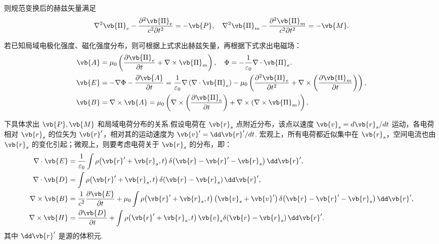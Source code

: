 则规范变换后的赫兹矢量满足
\begin{align*}
	\nabla^2 \vb{\Pi}_e - \frac{\partial^2 \vb{\Pi}_e}{c^2 \partial t^2} = -\vb{P}, \quad \nabla^2 \vb{\Pi}_m - \frac{\partial^2 \vb{\Pi}_m}{c^2 \partial t^2} = -\vb{M}.
\end{align*}

若已知局域电极化强度、磁化强度分布，则可根据上式求出赫兹矢量，再根据下式求出电磁场：
\begin{align*}
	\vb{A} &= \mu_0 \left( \frac{\partial \vb{\Pi}_e}{\partial t} + \nabla \times \vb{\Pi}_m \right), \quad \Phi = -\frac{1}{\varepsilon_0} \nabla \cdot \vb{\Pi}_e. \\
	\vb{E} &= -\nabla \Phi - \frac{\partial \vb{A}}{\partial t} = \frac{1}{\varepsilon_0} \nabla \left( \nabla \cdot \vb{\Pi}_e \right) - \mu_0 \left( \frac{\partial^2 \vb{\Pi}_e}{\partial t^2} + \nabla \times \left( \frac{\partial \vb{\Pi}_m}{\partial t} \right) \right), \\
	\vb{B} &= \nabla \times \vb{A} = \mu_0 \left( \nabla \times \left( \frac{\partial \vb{\Pi}_e}{\partial t} \right) + \nabla \times \left( \nabla \times \vb{\Pi}_m \right) \right).
\end{align*}

下具体求出 \(\vb{P}, \vb{M}\) 和局域电荷分布的关系.假设电荷在 \(\vb{r}_s\) 点附近分布，该点以速度 \(\vb{v}_s = d\vb{r}_s/dt\) 运动，各电荷相对 \(\vb{r}_s\) 的位矢为 \(\vb{r}'\)，相对其的运动速度为 \(\vb{v}' = \dd \vb{r}'/dt\).
宏观上，所有电荷都近似集中在 \(\vb{r}_s\)，空间电流也由 \(\vb{r}_s\) 的变化引起；微观上，则要考虑电荷关于 \(\vb{r}_s\) 的分布，即：
\begin{align*}
	\nabla \cdot \vb{E} &= \frac{1}{\varepsilon_0} \int \rho\!\left( \vb{r}' + \vb{r}_s, t \right) \delta\!\left( \vb{r} - \vb{r}' - \vb{r}_s \right) \dd \vb{r}', \\
	\nabla \cdot \vb{D} &= \int \rho\!\left( \vb{r}' + \vb{r}_s, t \right) \delta\!\left( \vb{r} - \vb{r}_s \right) \dd \vb{r}', \\
	\nabla \times \vb{B} &= \frac{1}{c^2} \frac{\partial \vb{E}}{\partial t} + \mu_0 \int \rho\!\left( \vb{r}' + \vb{r}_s, t \right) \left( \vb{v}_s + \vb{v}' \right) \delta\!\left( \vb{r} - \vb{r}' - \vb{r}_s \right) \dd \vb{r}', \\
	\nabla \times \vb{H} &= \frac{\partial \vb{D}}{\partial t} + \int \rho\!\left( \vb{r}' + \vb{r}_s, t \right) \vb{v}_s \delta\!\left( \vb{r} - \vb{r}_s \right) \dd \vb{r}'.
\end{align*}
其中 \(\dd \vb{r}'\) 是源的体积元.

